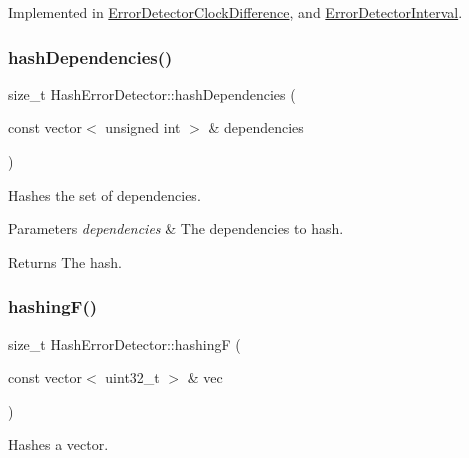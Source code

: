 Implemented in \hyperlink{class_error_detector_clock_difference_a26f4c2905859947201d0a18146f2e961}{Error\+Detector\+Clock\+Difference}, and \hyperlink{class_error_detector_interval_a9494a918f551eb1efcab39ffd68316d6}{Error\+Detector\+Interval}.

\mbox{\label{class_hash_error_detector_a37d0ee7d8a01b530a03262e4483c53d9}} 
\subsubsection{\texorpdfstring{hash\+Dependencies()}{hashDependencies()}}
{\footnotesize\ttfamily size\+\_\+t Hash\+Error\+Detector\+::hash\+Dependencies (\begin{DoxyParamCaption}\item[{const vector$<$ unsigned int $>$ \&}]{dependencies }\end{DoxyParamCaption})}



Hashes the set of dependencies. 


\begin{DoxyParams}{Parameters}
{\em dependencies} & The dependencies to hash. \\
\hline
\end{DoxyParams}
\begin{DoxyReturn}{Returns}
The hash. 
\end{DoxyReturn}
\mbox{\label{class_hash_error_detector_aa0b6a85ef4078e4851cd56b612a539c5}} 
\subsubsection{\texorpdfstring{hashing\+F()}{hashingF()}}
{\footnotesize\ttfamily size\+\_\+t Hash\+Error\+Detector\+::hashingF (\begin{DoxyParamCaption}\item[{const vector$<$ uint32\+\_\+t $>$ \&}]{vec }\end{DoxyParamCaption})}



Hashes a vector. 


